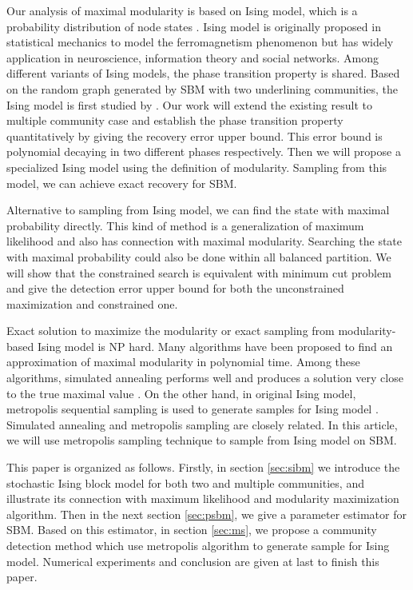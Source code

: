 \documentclass[journal]{IEEEtran}
\newcommand{\1}{\mathbbm{1}}
\begin{document}
Our analysis of maximal modularity is based on Ising model, which is a probability distribution of node states \cite{ising1925beitrag}.
Ising model is originally proposed in statistical mechanics to model the ferromagnetism phenomenon but has widely application in neuroscience, information theory
and social networks. Among different variants of Ising models, the phase transition property is shared. Based on the random graph generated by SBM with two underlining communities,
the Ising model is first studied by \cite{ye2020exact}. Our work will extend the existing result to multiple community case and establish the phase transition
property quantitatively by giving the recovery error upper bound. This error bound is polynomial decaying in two different phases respectively. Then we will propose a specialized Ising model using the definition of modularity. Sampling from this model,
we can achieve exact recovery for SBM.

Alternative to sampling from Ising model, we can find the state with maximal probability directly. This kind of method
is a generalization of maximum likelihood and also has connection with maximal modularity. Searching the state with maximal probability
could also be done within all balanced partition. We will show that the constrained search is equivalent with minimum cut problem and give the detection
error upper bound for both the unconstrained maximization and constrained one.

Exact solution to maximize the modularity or exact sampling from modularity-based Ising model is NP hard. Many algorithms have been proposed to find an approximation of maximal modularity in polynomial time.
Among these algorithms, simulated annealing performs well and produces a solution very close to the true maximal value \cite{liu2010detecting}.
On the other hand, in original Ising model,
metropolis sequential sampling is used to generate samples for Ising model \cite{metropolis1953equation}. Simulated annealing and metropolis sampling are closely related. In this article, we will
use metropolis sampling technique to sample from Ising model on SBM.

This paper is organized as follows. Firstly, in section \ref{sec:sibm} we introduce the stochastic Ising block model for both two and multiple communities, and illustrate its connection with maximum likelihood and modularity
maximization algorithm. Then in the next section \ref{sec:psbm}, we give a parameter estimator for SBM. Based on this estimator, in section \ref{sec:ms},
we propose a community detection method which use metropolis algorithm to generate sample for Ising model. Numerical experiments and conclusion are given at last
to finish this paper.
\end{document}
